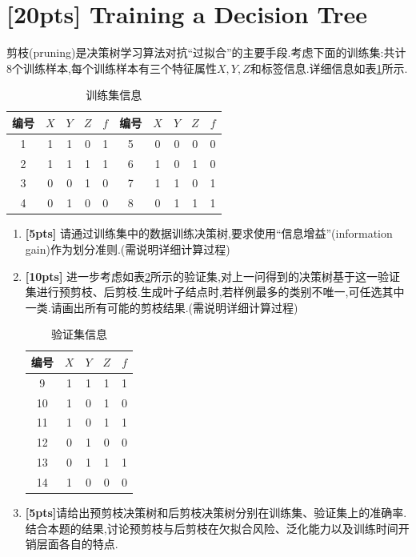 \documentclass[a4paper,UTF8]{article}
\numberwithin{equation}{section}
\theoremstyle{definition}
\begin{document}
\section{[20pts] Training a Decision Tree}
剪枝(pruning)是决策树学习算法对抗“过拟合”的主要手段.考虑下面的训练集:共计8个训练样本,每个训练样本有三个特征属性$X,Y,Z$和标签信息.详细信息如表\ref{problem2_training_set}所示.
\begin{table}[ht]
    \centering
	\setlength{\abovecaptionskip}{0pt}
	\setlength{\belowcaptionskip}{5pt}
    \caption{训练集信息}
	\label{problem2_training_set}
    \begin{tabular}{cccc|c||cccc|c}
        \hline 
        编号 & $X$ & $Y$ & $Z$ & $f$ & 编号 & $X$ & $Y$ & $Z$ & $f$ \\
    \hline1 &   1 &  1 &   0 &   1 &   5 &    0 &   0 &   0 &   0\\
          2 &   1 &  1 &   1 &   1 &   6 &    1 &   0 &   1 &   0 \\
          3 &   0 &  0 &   1 &   0 &   7 &    1 &   1 &   0 &   1\\
          4 &   0 &  1 &   0 &   0 &   8 &    0 &   1 &   1 &   1\\
        \hline
    \end{tabular}
\end{table}
\begin{enumerate}
	\item[(1)] \textbf{[5pts]} 请通过训练集中的数据训练决策树,要求使用“信息增益”(information gain)作为划分准则.(需说明详细计算过程)
	\item[(2)] \textbf{[10pts]} 进一步考虑如表\ref{problem2_validation_set}所示的验证集,对上一问得到的决策树基于这一验证集进行预剪枝、后剪枝.生成叶子结点时,若样例最多的类别不唯一,可任选其中一类.请画出所有可能的剪枝结果.(需说明详细计算过程)
	\begin{table}[ht]
		\centering
		\setlength{\abovecaptionskip}{0pt}
		\setlength{\belowcaptionskip}{5pt}
		\caption{验证集信息}
		\label{problem2_validation_set}
		\begin{tabular}{cccc|c}
		\hline
		编号 & $X$ & $Y$ & $Z$ & $f$ \\ \hline
		  9 &   1 &   1&   1&    1\\
		  10 &   1&    0&   1&    0\\
		  11 &   1&    0&   1&    1\\
		  12 &   0&    1&   0&    0\\
		  13 &   0&    1&   1&    1\\
		  14 &   1&    0&   0&    0\\ \hline
		\end{tabular}
	\end{table}
	\item[(3)] \textbf{[5pts]}请给出预剪枝决策树和后剪枝决策树分别在训练集、验证集上的准确率. 结合本题的结果,讨论预剪枝与后剪枝在欠拟合风险、泛化能力以及训练时间开销层面各自的特点. 
\end{enumerate}
\end{document}
